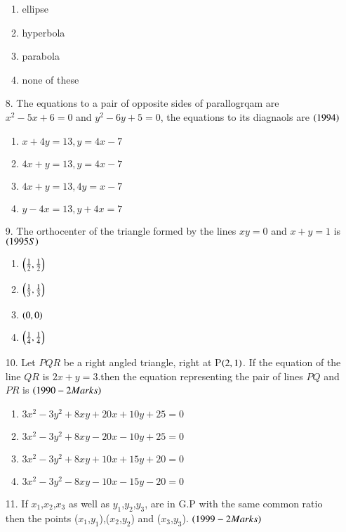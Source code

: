 \documentclass[journal,12pt,onecolumn]{IEEEtran}
\theoremstyle{remark}
\begin{document}
\begin{enumerate}
\begin{enumerate}
       \item ellipse
       \item hyperbola
       \item parabola
       \item none of these
    
\end{enumerate}
\item[8.] The equations to a pair of opposite sides of parallogrqam are $x^2-5x+6=0$ and $y^2-6y+5=0$, the equations to its diagnaols are 
\hfill{$\left(1994\right)$}
\begin{enumerate}
    
      \item $x+4y=13,y=4x-7$
    \item $4x+y=13,y=4x-7$
      \item $4x+y=13,4y=x-7$
        \item $y-4x=13,y+4x=7$
    
\end{enumerate}
\item[9.] The orthocenter of the triangle formed by the lines $xy=0$ and $x+y=1$ is 
\hfill{$\left(1995S\right)$}
\begin{enumerate}
    
      \item $\left(\frac{1}{2},\frac{1}{2}\right)$
      \item $\left(\frac{1}{3},\frac{1}{3}\right)$
      \item $\left(0,0\right)$
      \item $\left(\frac{1}{4},\frac{1}{4}\right)$
    
\end{enumerate}
\item[10.] Let $PQR$ be a right angled triangle, right at P$\left(2,1\right)$. If the equation of the line $QR$ is $2x+y=3$.then the equation representing the pair of lines $PQ$ and $PR$ is
\hfill{$\left(1990-2 Marks\right)$}
\begin{enumerate}
    \item $3x^2-3y^2+8xy+20x+10y+25=0$
    \item $3x^2-3y^2+8xy-20x-10y+25=0$
    \item $3x^2-3y^2+8xy+10x+15y+20=0$
    \item $3x^2-3y^2-8xy-10x-15y-20=0$
\end{enumerate}
\item[11.] If $x_1$,$x_2$,$x_3$ as well as $y_1$,$y_2$,$y_3$, are in G.P with the same common ratio then the points ($x_1$,$y_1$),($x_2$,$y_2$) and ($x_3$,$y_3$).
\hfill{$\left(1999-2 Marks\right)$}
\begin{enumerate}
    

\end{enumerate}
\end{enumerate}
\end{document}
